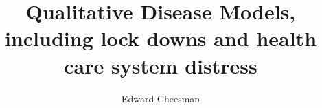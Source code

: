 \documentclass[a4paper]{article}
\begin{document}
	\title{Qualitative Disease Models, including lock downs and health care system distress}
	\author{Edward Cheesman}
	\date{}
	\maketitle
	\tableofcontents
	
	
	
	
\end{document}
